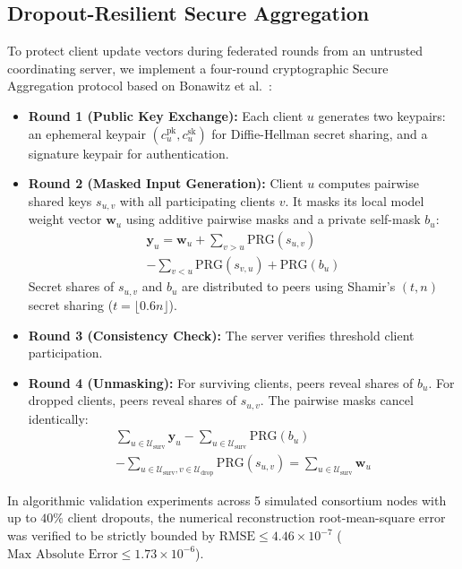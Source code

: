 \documentclass[conference]{IEEEtran}
\begin{document}
\subsection{Dropout-Resilient Secure Aggregation}
To protect client update vectors during federated rounds from an untrusted coordinating server, we implement a four-round cryptographic Secure Aggregation protocol based on Bonawitz et al.~\cite{bonawitz2017practical}:
\begin{itemize}
    \item \textbf{Round 1 (Public Key Exchange):} Each client $u$ generates two keypairs: an ephemeral keypair $(c_u^{\text{pk}}, c_u^{\text{sk}})$ for Diffie-Hellman secret sharing, and a signature keypair for authentication.
    \item \textbf{Round 2 (Masked Input Generation):} Client $u$ computes pairwise shared keys $s_{u,v}$ with all participating clients $v$. It masks its local model weight vector $\mathbf{w}_u$ using additive pairwise masks and a private self-mask $b_u$:
    \begin{multline}
        \mathbf{y}_u = \mathbf{w}_u + \sum_{v > u} \text{PRG}(s_{u,v}) \\
        - \sum_{v < u} \text{PRG}(s_{v,u}) + \text{PRG}(b_u)
    \end{multline}
    Secret shares of $s_{u,v}$ and $b_u$ are distributed to peers using Shamir's $(t, n)$ secret sharing ($t = \lfloor 0.6n \rfloor$).
    \item \textbf{Round 3 (Consistency Check):} The server verifies threshold client participation.
    \item \textbf{Round 4 (Unmasking):} For surviving clients, peers reveal shares of $b_u$. For dropped clients, peers reveal shares of $s_{u,v}$. The pairwise masks cancel identically:
    \begin{multline}
        \sum_{u \in \mathcal{U}_{\text{surv}}} \mathbf{y}_u - \sum_{u \in \mathcal{U}_{\text{surv}}} \text{PRG}(b_u) \\
        - \sum_{u \in \mathcal{U}_{\text{surv}}, v \in \mathcal{U}_{\text{drop}}} \text{PRG}(s_{u,v}) = \sum_{u \in \mathcal{U}_{\text{surv}}} \mathbf{w}_u
    \end{multline}
\end{itemize}
In algorithmic validation experiments across 5 simulated consortium nodes with up to $40\%$ client dropouts, the numerical reconstruction root-mean-square error was verified to be strictly bounded by $\text{RMSE} \le 4.46 \times 10^{-7}$ ($\text{Max Absolute Error} \le 1.73 \times 10^{-6}$).
\end{document}
